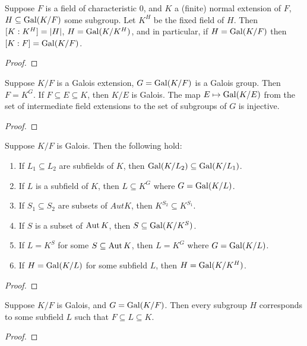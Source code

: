 \begin{theorem}
    Suppose \(F\) is a field of characteristic 0,
    and \(K\) a (finite) normal extension of \(F\),
    \(H \subseteq \operatorname{Gal}(K/F)\) some subgroup.
    Let \(K^H\) be the fixed field of \(H\).
    Then \([K:K^H] = \abs{H}\), \(H = \operatorname{Gal}(K/K^H)\),
    and in particular, if \(H = \operatorname{Gal}(K/F)\) then \([K:F] = \operatorname{Gal}(K/F)\).
\end{theorem}
\begin{proof}
\end{proof}

\begin{theorem}
    Suppose \(K/F\) is a Galois extension, \(G = \operatorname{Gal}(K/F)\) is a Galois group.
    Then \(F = K^G\).
    If \(F \subseteq E \subseteq K\), then \(K/E\) is Galois.
    The map \(E \mapsto \operatorname{Gal}(K/E)\) from the set of intermediate field extensions
    to the set of subgroups of \(G\) is injective.
\end{theorem}
\begin{proof}
\end{proof}

\begin{lemma}
    Suppose \(K/F\) is Galois. Then the following hold:
    \begin{enumerate}[label={(\alph*)}, itemsep=0mm]
        \item If \(L_1 \subseteq L_2\) are subfields of \(K\),
            then \(\operatorname{Gal}(K/L_2) \subseteq \operatorname{Gal}(K/L_1)\).
        \item If \(L\) is a subfield of \(K\),
            then \(L \subseteq K^G\) where \(G = \operatorname{Gal}(K/L)\).
        \item If \(S_1 \subseteq S_2\) are subsets of \(Aut K\),
            then \(K^{S_2} \subseteq K^{S_1}\).
        \item If \(S\) is a subset of \(\operatorname{Aut} K\),
            then \(S \subseteq \operatorname{Gal}(K/K^S)\).
        \item If \(L = K^S\) for some \(S \subseteq \operatorname{Aut} K\),
            then \(L = K^G\) where \(G = \operatorname{Gal}(K/L)\).
        \item If \(H = \operatorname{Gal}(K/L)\) for some subfield \(L\),
            then \(H = \operatorname{Gal}(K/K^H)\).
    \end{enumerate}
\end{lemma}
\begin{proof}
\end{proof}
\begin{corollary}
    Suppose \(K/F\) is Galois, and \(G = \operatorname{Gal}(K/F)\).
    Then every subgroup \(H\) corresponds to some subfield \(L\)
    such that \(F \subseteq L \subseteq K\).
\end{corollary}
\begin{proof}
\end{proof}

